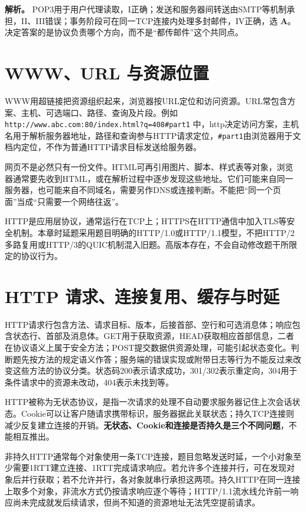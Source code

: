 \textbf{解析。} POP3用于用户代理读取，I正确；发送和服务器间转送由SMTP等机制承担，II、III错误；事务阶段可在同一TCP连接内处理多封邮件，IV正确，选 \textbf{A}。决定答案的是协议负责哪个方向，而不是``都传邮件''这个共同点。

\section{WWW、URL 与资源位置}\label{CN06-07}

WWW用超链接把资源组织起来，浏览器按URL定位和访问资源。URL常包含方案、主机、可选端口、路径、查询及片段。例如 \texttt{http:\allowbreak{}/\allowbreak{}/\allowbreak{}www.\allowbreak{}abc.\allowbreak{}com:\allowbreak{}80/\allowbreak{}index.\allowbreak{}html?q=\allowbreak{}408\#part1} 中，http决定访问方案，主机名用于解析服务器地址，路径和查询参与HTTP请求定位，\texttt{\#part1}由浏览器用于文档内定位，不作为普通HTTP请求目标发送给服务器。

网页不是必然只有一份文件。HTML可再引用图片、脚本、样式表等对象，浏览器通常要先收到HTML，或在解析过程中逐步发现这些地址。它们可能来自同一服务器，也可能来自不同域名，需要另作DNS或连接判断。不能把``同一个页面''当成``只需要一个网络往返''。

HTTP是应用层协议，通常运行在TCP上；HTTPS在HTTP通信中加入TLS等安全机制。本章时延题采用题目明确的HTTP/1.0或HTTP/1.1模型，不把HTTP/2多路复用或HTTP/3的QUIC机制混入旧题。高版本存在，不会自动修改题干所限定的协议行为。

\section{HTTP 请求、连接复用、缓存与时延}\label{CN06-08}

HTTP请求行包含方法、请求目标、版本，后接首部、空行和可选消息体；响应包含状态行、首部及消息体。GET用于获取资源，HEAD获取相应首部信息，二者在协议语义上属于安全方法；POST提交数据供资源处理，可能引起状态变化。判断题先按方法的规定语义作答；服务端的错误实现或附带日志等行为不能反过来改变这些方法的协议分类。状态码200表示请求成功，301/302表示重定向，304用于条件请求中的资源未改动，404表示未找到等。

HTTP被称为无状态协议，是指一次请求的处理不自动要求服务器记住上次会话状态。Cookie可以让客户随请求携带标识，服务器据此关联状态；持久TCP连接则减少反复建立连接的开销。\textbf{无状态、Cookie和连接是否持久是三个不同问题}，不能相互推出。

非持久HTTP通常每个对象使用一条TCP连接，题目忽略发送时延，一个小对象至少需要1RTT建立连接、1RTT完成请求响应。若允许多个连接并行，可在发现对象后并行获取；若不允许并行，各对象就串行承担这两项。持久HTTP在同一连接上取多个对象，非流水方式仍按请求响应逐个等待；HTTP/1.1流水线允许前一响应尚未完成就发后续请求，但尚不知道的资源地址无法凭空提前请求。

